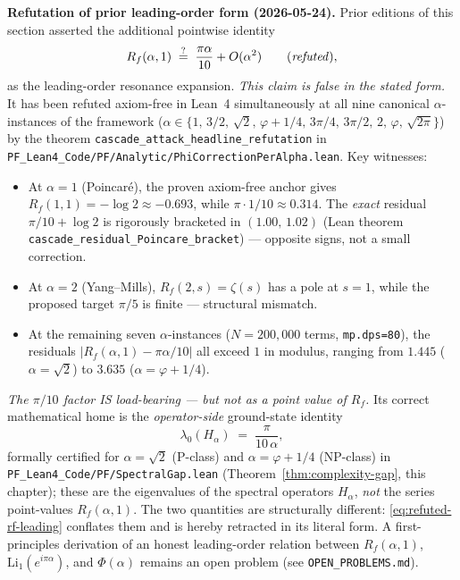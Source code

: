 \medskip
\noindent\textbf{Refutation of prior leading-order form (2026-05-24).} Prior editions of this section asserted the additional pointwise identity
\begin{equation}
\label{eq:refuted-rf-leading}
R_f(\alpha, 1) \;\stackrel{?}{=}\; \frac{\pi\alpha}{10} + O(\alpha^2)
\qquad (\text{\emph{refuted}}),
\end{equation}
as the leading-order resonance expansion. \emph{This claim is false in the stated form.} It has been refuted axiom-free in Lean~4 simultaneously at all nine canonical $\alpha$-instances of the framework ($\alpha \in \{1,\,3/2,\,\sqrt{2},\,\varphi+1/4,\,3\pi/4,\,3\pi/2,\,2,\,\varphi,\,\sqrt{2\pi}\}$) by the theorem \texttt{cascade\_attack\_headline\_refutation} in \texttt{PF\_Lean4\_Code/PF/Analytic/Phi}\-\texttt{CorrectionPerAlpha.lean}. Key witnesses:
\begin{itemize}
\item At $\alpha = 1$ (Poincaré), the proven axiom-free anchor gives $R_f(1,1) = -\log 2 \approx -0.693$, while $\pi\cdot 1/10 \approx 0.314$. The \emph{exact} residual $\pi/10 + \log 2$ is rigorously bracketed in $(1.00,\,1.02)$ (Lean theorem \texttt{cascade\_residual\_Poincare\_bracket}) — opposite signs, not a small correction.
\item At $\alpha = 2$ (Yang--Mills), $R_f(2,s) = \zeta(s)$ has a pole at $s = 1$, while the proposed target $\pi/5$ is finite — structural mismatch.
\item At the remaining seven $\alpha$-instances ($N=200{,}000$ terms, \texttt{mp.dps=80}), the residuals $\lvert R_f(\alpha,1) - \pi\alpha/10 \rvert$ all exceed $1$ in modulus, ranging from $1.445$ ($\alpha=\sqrt{2}$) to $3.635$ ($\alpha = \varphi+1/4$).
\end{itemize}
\emph{The $\pi/10$ factor IS load-bearing — but not as a point value of $R_f$.} Its correct mathematical home is the \emph{operator-side} ground-state identity
\begin{equation}
\label{eq:lambda0-operator}
\lambda_0(H_\alpha) \;=\; \frac{\pi}{10\,\alpha},
\end{equation}
formally certified for $\alpha = \sqrt{2}$ (P-class) and $\alpha = \varphi + 1/4$ (NP-class) in \texttt{PF\_Lean4\_Code/PF/SpectralGap.lean} (Theorem~\ref{thm:complexity-gap}, this chapter); these are the eigenvalues of the spectral operators $H_\alpha$, \emph{not} the series point-values $R_f(\alpha,1)$. The two quantities are structurally different: \eqref{eq:refuted-rf-leading} conflates them and is hereby retracted in its literal form. A first-principles derivation of an honest leading-order relation between $R_f(\alpha,1)$, $\text{Li}_1(e^{i\pi\alpha})$, and $\Phi(\alpha)$ remains an open problem (see \texttt{OPEN\_PROBLEMS.md}).

